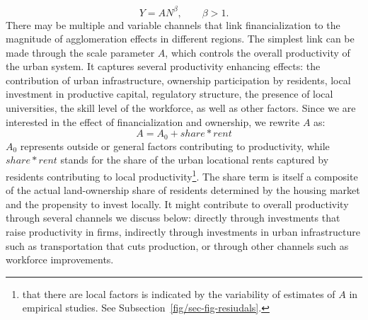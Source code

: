 \begin{equation}\label{eq-agglom-eqn2}
    Y=AN^\beta,\qquad \beta>1. 
\end{equation}
There may be multiple and variable channels that link financialization to the magnitude of agglomeration effects in different regions. 
The simplest link can be made through the scale parameter $A$, which controls the overall productivity of the urban system. It captures several productivity enhancing effects: the contribution of urban infrastructure, ownership participation by residents, local investment in productive capital, regulatory structure, the presence of local universities, the skill level of the workforce, as well as other factors. 
Since we are interested in the effect of financialization and ownership, we rewrite $A$ as:
\[ A= A_0 + share * rent\]
$A_0$ represents outside or general factors contributing to productivity, while $share*rent$ stands for the share of the urban locational rents captured by residents contributing to local productivity\footnote{that there are local factors is indicated by the variability of estimates of $A$ in empirical studies. See Subsection~\ref{fig/sec-fig-resiudals}.}. The share term is itself a composite of the actual land-ownership share of residents determined by the housing market and the propensity to invest locally.  It might contribute to overall productivity through several channels we discuss below:  directly through investments that raise productivity in firms, indirectly through investments in urban infrastructure such as transportation that cuts production, or through other channels such as workforce improvements. 


 






